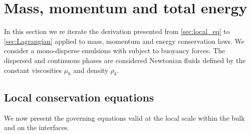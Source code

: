 \section{Mass, momentum and total energy}
\label{ap:hypothesis}

In this section we re iterate the derivation presented from \ref{sec:local_eq} to \ref{sec:Lagrangian} applied to mass, momentum and energy conservation laws. 
We consider a mono-disperse emulsions with subject to buoyancy forces. 
The dispersed and continuous phases are considered Newtonian fluids defined by the constant viscosities $\mu_k$ and density $\rho_k$.


\subsection{Local conservation equations}

We now present the governing equations valid at the local scale within the bulk and on the interfaces. 

